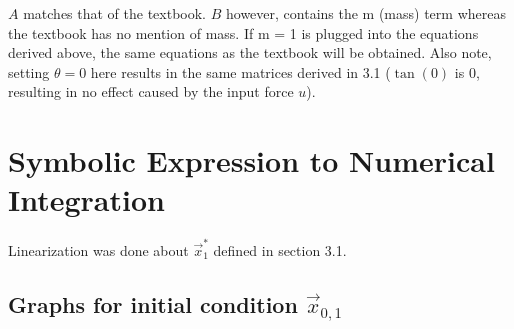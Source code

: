 \documentclass[10pt]{article}
\begin{document}
$A$ matches that of the textbook. $B$ however, contains the m (mass) term whereas the textbook has no mention of mass. If m = 1 is plugged into the equations derived above, the same equations as the textbook will be obtained. Also note, setting $\theta = 0$ here results in the same matrices derived in 3.1 ($\tan(0)$ is 0, resulting in no effect caused by the input force $u$).

\section{Symbolic Expression to Numerical Integration}
Linearization was done about $\vec{x}_1^*$ defined in {}section 3.1.

\subsection{Graphs for initial condition \texorpdfstring{$\vec{x}_{0,1}$}{x01}}
\end{document}
